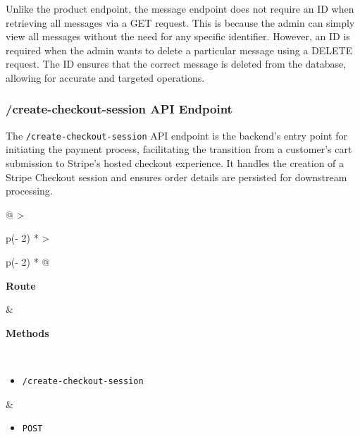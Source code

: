 Unlike the product endpoint, the message endpoint does not require an ID when retrieving all messages via a GET request. This is because the admin can simply view all messages without the need for any specific identifier. However, an ID is required when the admin wants to delete a particular message using a DELETE request. The ID ensures that the correct message is deleted from the database, allowing for accurate and targeted operations.

\subsubsection{/create-checkout-session API Endpoint}

The \texttt{/create-checkout-session} API endpoint is the backend's entry point for initiating the payment process, facilitating the transition from a customer's cart submission to Stripe's hosted checkout experience. It handles the creation of a Stripe Checkout session and ensures order details are persisted for downstream processing.

\begin{longtable}[]{@{}
    >{\raggedright\arraybackslash}p{(\columnwidth - 2\tabcolsep) * }
    >{\raggedright\arraybackslash}p{(\columnwidth - 2\tabcolsep) * }@{}}
\toprule
\begin{minipage}[b]{\linewidth}\raggedright
\textbf{Route}
\end{minipage} & \begin{minipage}[b]{\linewidth}\raggedright
\textbf{Methods}
\end{minipage} \\
\midrule
\endhead
\begin{itemize}\itemsep0em
    \item \texttt{/create-checkout-session}
\end{itemize} &
\begin{itemize}\itemsep0em
    \item \texttt{POST}
\end{itemize} \\
\bottomrule
\end{longtable}

